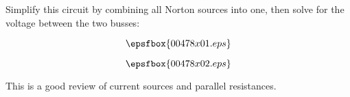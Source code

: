 

Simplify this circuit by combining all Norton sources into one, then solve for the voltage between the two busses:

$$\epsfbox{00478x01.eps}$$







$$\epsfbox{00478x02.eps}$$







This is a good review of current sources and parallel resistances.




